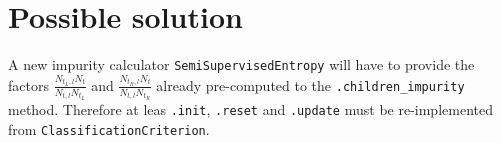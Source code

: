 \documentclass[a4paper,10pt]{article}
\begin{document}
\section{Possible solution}
A new impurity calculator \texttt{SemiSupervisedEntropy} will have to provide the factors $\frac{N_{t_L,l}N_t}{N_{t,l}N_{t_L}}$ and $\frac{N_{t_R,l}N_t}{N_{t,l}N_{t_R}}$ already pre-computed to the \texttt{.children\_impurity} method. Therefore at leas \texttt{.init}, \texttt{.reset} and \texttt{.update} must be re-implemented from \texttt{ClassificationCriterion}.
\end{document}
